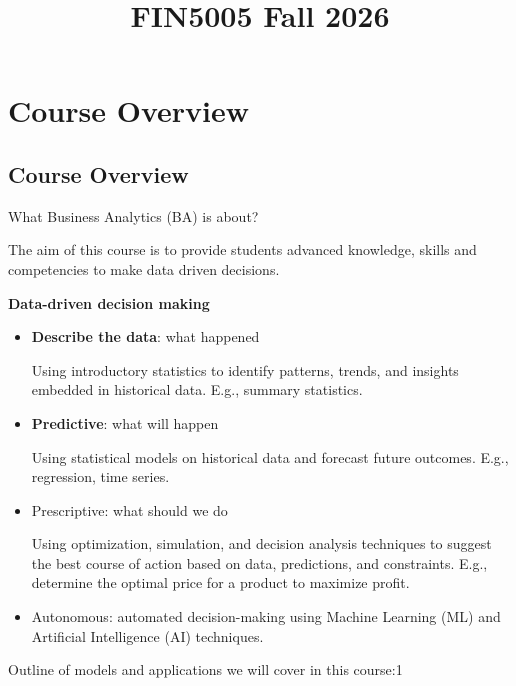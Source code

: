 \documentclass[
  12pt,
  letterpaper,
]{scrbook}
\title{FIN5005 Fall 2026}
\author{}
\date{}
\renewcommand*\contentsname{Table of contents}
\newcommand\contentsname{Table of contents}
\theoremstyle{plain}
\theoremstyle{definition}
\theoremstyle{remark}
\begin{document}
\frontmatter
\maketitle

\renewcommand*\contentsname{Table of contents}
{
\hypersetup{linkcolor=}
\setcounter{tocdepth}{2}
\tableofcontents
}

\mainmatter
\chapter{Course Overview}\label{course-overview}

\section{Course Overview}\label{course-overview-1}

What Business Analytics (BA) is about?

The aim of this course is to provide students advanced knowledge, skills
and competencies to make data driven decisions.

\textbf{Data-driven decision making}

\begin{itemize}
\item
  \textbf{Describe the data}: what happened

  Using introductory statistics to identify patterns, trends, and
  insights embedded in historical data. E.g., summary statistics.
\item
  \textbf{Predictive}: what will happen

  Using statistical models on historical data and forecast future
  outcomes. E.g., regression, time series.
\item
  Prescriptive: what should we do

  Using optimization, simulation, and decision analysis techniques to
  suggest the best course of action based on data, predictions, and
  constraints. E.g., determine the optimal price for a product to
  maximize profit.
\item
  Autonomous: automated decision-making using Machine Learning (ML) and
  Artificial Intelligence (AI) techniques.
\end{itemize}

Outline of models and applications we will cover in this course:1
\end{document}
